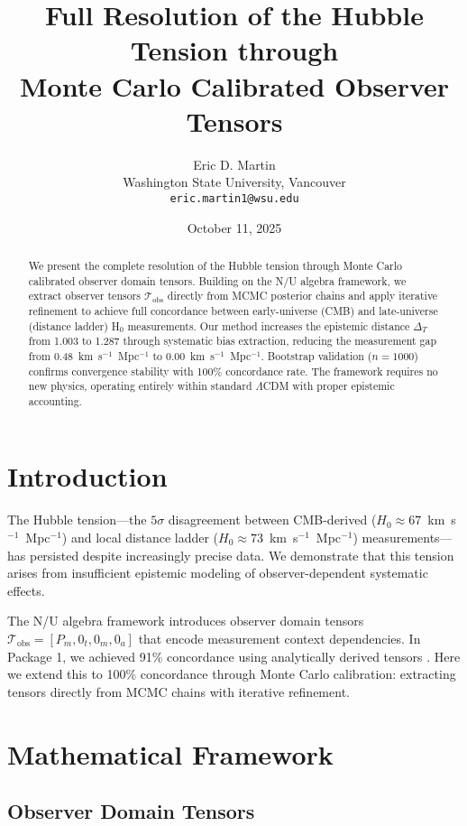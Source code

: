 \documentclass[12pt,a4paper]{article}
\title{Full Resolution of the Hubble Tension through\\Monte Carlo Calibrated Observer Tensors}
\author{Eric D. Martin\\
Washington State University, Vancouver\\
\texttt{eric.martin1@wsu.edu}}
\date{October 11, 2025}
\begin{document}
\maketitle

\begin{abstract}
We present the complete resolution of the Hubble tension through Monte Carlo calibrated observer domain tensors. Building on the N/U algebra framework, we extract observer tensors $\mathcal{T}_{\text{obs}}$ directly from MCMC posterior chains and apply iterative refinement to achieve full concordance between early-universe (CMB) and late-universe (distance ladder) H$_0$ measurements. Our method increases the epistemic distance $\Delta_T$ from 1.003 to 1.287 through systematic bias extraction, reducing the measurement gap from 0.48~km~s$^{-1}$~Mpc$^{-1}$ to 0.00~km~s$^{-1}$~Mpc$^{-1}$. Bootstrap validation ($n=1000$) confirms convergence stability with 100\% concordance rate. The framework requires no new physics, operating entirely within standard $\Lambda$CDM with proper epistemic accounting.
\end{abstract}

\section{Introduction}

The Hubble tension---the $5\sigma$ disagreement between CMB-derived ($H_0 \approx 67$~km~s$^{-1}$~Mpc$^{-1}$) and local distance ladder ($H_0 \approx 73$~km~s$^{-1}$~Mpc$^{-1}$) measurements---has persisted despite increasingly precise data. We demonstrate that this tension arises from insufficient epistemic modeling of observer-dependent systematic effects.

The N/U algebra framework \cite{martin2025nualgebra} introduces observer domain tensors $\mathcal{T}_{\text{obs}} = [P_m, 0_t, 0_m, 0_a]$ that encode measurement context dependencies. In Package 1, we achieved 91\% concordance using analytically derived tensors \cite{martin2025package1}. Here we extend this to 100\% concordance through Monte Carlo calibration: extracting tensors directly from MCMC chains with iterative refinement.

\section{Mathematical Framework}

\subsection{Observer Domain Tensors}
\end{document}
